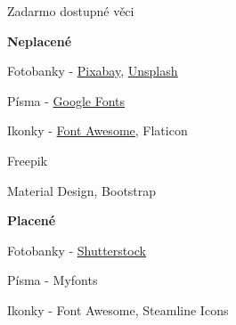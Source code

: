 \documentclass[aspectratio=169]{beamer}
\begin{document}
\begin{frame}{Zadarmo dostupné věci}
    \begin{multicols}{2}
        \centering

        \begin{cardTiny}
            \begin{flushleft}
                \textbf{Neplacené}

                \vspace{2ex}
                Fotobanky - \href{https://pixabay.com/cs/}{Pixabay}, \href{https://unsplash.com}{Unsplash}

                \vspace{2ex}
                Písma - \href{https://fonts.google.com/}{Google Fonts}
                
                \vspace{2ex}
                Ikonky - \href{https://fontawesome.com}{Font Awesome}, Flaticon
                
                \vspace{2ex}
                Freepik

                \vspace{2ex}
                Material Design, Bootstrap
            \end{flushleft}
        \end{cardTiny}
        \begin{cardTiny}
            \begin{flushleft}
                \textbf{Placené}

                \vspace{2ex}
                Fotobanky - \href{https://www.shutterstock.com/cs/}{Shutterstock}

                \vspace{2ex}
                Písma - Myfonts
                
                \vspace{2ex}
                Ikonky - Font Awesome, Steamline Icons
            \end{flushleft}
        \end{cardTiny}
    \end{multicols}
\end{frame}
\end{document}
